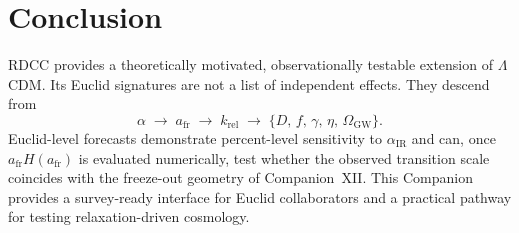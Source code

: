 \documentclass[11pt,a4paper]{article}
\begin{document}

\section{Conclusion}

RDCC provides a theoretically motivated, observationally testable extension
of \(\Lambda\)CDM. Its Euclid signatures are not a list of independent
effects. They descend from
\begin{equation}
  \alpha
  \;\rightarrow\;
  a_{\mathrm{fr}}
  \;\rightarrow\;
  k_{\mathrm{rel}}
  \;\rightarrow\;
  \{D,\, f,\, \gamma,\, \eta,\, \Omega_{\mathrm{GW}}\}.
\end{equation}
Euclid-level forecasts demonstrate percent-level sensitivity to
\(\alpha_{\mathrm{IR}}\) and can, once \(a_{\mathrm{fr}}H(a_{\mathrm{fr}})\)
is evaluated numerically, test whether the observed transition scale
coincides with the freeze-out geometry of Companion~XII. This Companion
provides a survey-ready interface for Euclid collaborators and a practical
pathway for testing relaxation-driven cosmology.
\end{document}
